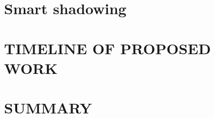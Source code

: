 \documentclass[driverfallback=dvipdfmx,final]{pittetd}
\begin{document}
\chapter{Smart shadowing}
\label{chapter:smart}


\chapter{TIMELINE OF PROPOSED WORK}
\label{chapter:timeline}


\chapter{SUMMARY}
\label{chapter:summary}


\appendix                      
%

\begin{singlespace}

{
\footnotesize

}
\end{singlespace}
\end{document}
